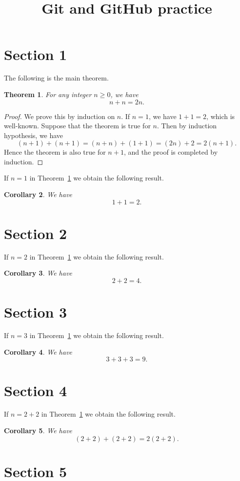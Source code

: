 \documentclass{amsart}
\title{Git and GitHub practice}
\newtheorem{thm}{Theorem}[section]
\newtheorem{cor}[thm]{Corollary}
\theoremstyle{definition}
\begin{document}
\maketitle



\section{Section 1}

The following is the main theorem.

\begin{thm}\label{thm:main}
For any integer $n\ge0$, we have
\[
  n + n  = 2n.
\]
\end{thm}
\begin{proof}
 We prove this by induction on $n$. If $n=1$, we have $1+1=2$, which is well-known. 
 Suppose that the theorem is true for $n$. Then by induction hypothesis, we have 
 \[
 (n+1) + (n+1) = (n+n) + (1+1) = (2n) + 2 = 2(n+1).  
 \]
Hence the theorem is also true for $n+1$, and the proof is completed by induction.
\end{proof}

If $n=1$ in Theorem~\ref{thm:main} we obtain the following result.

\begin{cor}
    We have
\[
  1 + 1  = 2.
\]
\end{cor}

\section{Section 2}

If $n=2$ in Theorem~\ref{thm:main} we obtain the following result.
\begin{cor}
    We have
\[
  2 + 2  = 4.
\]
\end{cor}

\section{Section 3}

If $n=3$ in Theorem~\ref{thm:main} we obtain the following result.
\begin{cor}
We have
\[
  3 + 3 + 3 = 9.
\]
\end{cor}

\section{Section 4}

If $n=2+2$ in Theorem~\ref{thm:main} we obtain the following result.
\begin{cor}
We have
\[
  (2+2) + (2+2)  = 2(2+2).
\]
\end{cor}

\section{Section 5}
\end{document}
